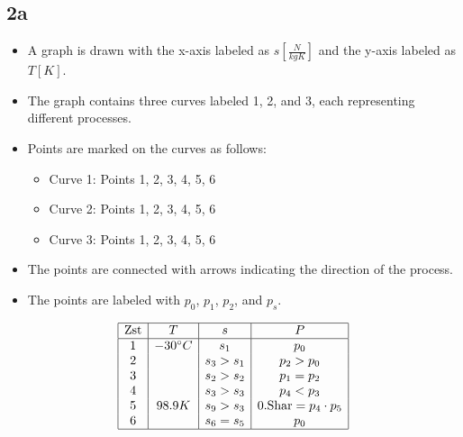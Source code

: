 

\subsection*{2a}

\begin{itemize}
    \item A graph is drawn with the x-axis labeled as $s \left[ \frac{N}{kgK} \right]$ and the y-axis labeled as $T \left[ K \right]$.
    \item The graph contains three curves labeled 1, 2, and 3, each representing different processes.
    \item Points are marked on the curves as follows:
        \begin{itemize}
            \item Curve 1: Points 1, 2, 3, 4, 5, 6
            \item Curve 2: Points 1, 2, 3, 4, 5, 6
            \item Curve 3: Points 1, 2, 3, 4, 5, 6
        \end{itemize}
    \item The points are connected with arrows indicating the direction of the process.
    \item The points are labeled with $p_0$, $p_1$, $p_2$, and $p_s$.
\end{itemize}

\[
\begin{array}{|c|c|c|c|}
\hline
\text{Zst} & T & s & P \\
\hline
1 & -30^\circ C & s_1 & p_0 \\
2 & & s_3 > s_1 & p_2 > p_0 \\
3 & & s_2 > s_2 & p_1 = p_2 \\
4 & & s_3 > s_3 & p_4 < p_3 \\
5 & 98.9K & s_9 > s_3 & 0.\text{Shar} = p_4 \cdot p_5 \\
6 & & s_6 = s_5 & p_0 \\
\hline
\end{array}
\]